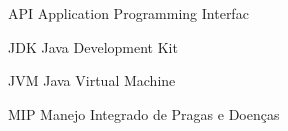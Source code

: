 
\begin{siglas}

    
    \item[API] Application Programming Interfac
    
    
    \item[JDK] Java Development Kit 
    
    \item[JVM] Java Virtual Machine
    
    \item[MIP] Manejo Integrado de Pragas e Doenças
    
    
    
    
    
\end{siglas}

